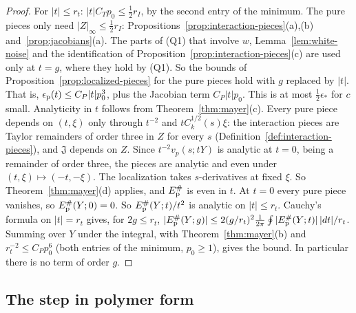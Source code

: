 \begin{proof}
For $|t|\le r_t$: $|t|C_Tp_0\le\frac12r_I$, by the second entry of the minimum. The pure pieces only need $|Z|_\infty\le\frac12r_I$: Propositions~\ref{prop:interaction-pieces}(a),(b) and~\ref{prop:jacobians}(a). The parts of (Q1) that involve $w$, Lemma~\ref{lem:white-noise} and the identification of Proposition~\ref{prop:interaction-pieces}(c) are used only at $t=g$, where they hold by (Q1). So the bounds of Proposition~\ref{prop:localized-pieces} for the pure pieces hold with $g$ replaced by $|t|$. That is, $\epsilon_{\rm p}(t)\le C_P|t|p_0^3$, plus the Jacobian term $C_P|t|p_0$. This is at most $\frac12\epsilon_*$ for $c$ small. Analyticity in $t$ follows from Theorem~\ref{thm:mayer}(c). Every pure piece depends on $(t,\xi)$ only through $t^{-2}$ and $tC_k^{1/2}(s)\xi$: the interaction pieces are Taylor remainders of order three in $Z$ for every $s$ (Definition~\ref{def:interaction-pieces}), and $\mathfrak J$ depends on $Z$. Since $t^{-2}v_p(s;tY)$ is analytic at $t=0$, being a remainder of order three, the pieces are analytic and even under $(t,\xi)\mapsto(-t,-\xi)$. The localization takes $s$-derivatives at fixed $\xi$. So Theorem~\ref{thm:mayer}(d) applies, and $E^\#_{\rm p}$ is even in $t$. At $t=0$ every pure piece vanishes, so $E^\#_{\rm p}(Y;0)=0$. So $E^\#_{\rm p}(Y;t)/t^2$ is analytic on $|t|\le r_t$. Cauchy's formula on $|t|=r_t$ gives, for $2g\le r_t$, $|E^\#_{\rm p}(Y;g)|\le2(g/r_t)^2\frac1{2\pi}\oint|E^\#_{\rm p}(Y;t)|\,|dt|/r_t$. Summing over $Y$ under the integral, with Theorem~\ref{thm:mayer}(b) and $r_t^{-2}\le C_Pp_0^6$ (both entries of the minimum, $p_0\ge1$), gives the bound. In particular there is no term of order $g$.
\end{proof}

\subsection{The step in polymer form}\label{subsec:cl-output}

